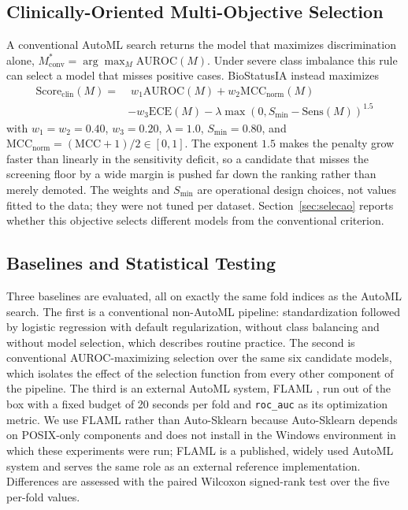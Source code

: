 \documentclass[conference]{IEEEtran}
\begin{document}
\subsection{Clinically-Oriented Multi-Objective Selection}
A conventional AutoML search returns the model that maximizes discrimination alone, $M^*_{\text{conv}} = \arg\max_{M} \text{AUROC}(M)$. Under severe class imbalance this rule can select a model that misses positive cases. BioStatusIA instead maximizes
\begin{align}
\text{Score}_{\text{clin}}(M) = & \; w_1 \text{AUROC}(M) + w_2 \text{MCC}_{\text{norm}}(M) \nonumber \\
& - w_3 \text{ECE}(M) - \lambda \max\!\left(0, S_{\min} - \text{Sens}(M)\right)^{1.5}
\end{align}
with $w_1 = w_2 = 0.40$, $w_3 = 0.20$, $\lambda = 1.0$, $S_{\min} = 0.80$, and $\text{MCC}_{\text{norm}} = (\text{MCC}+1)/2 \in [0,1]$. The exponent $1.5$ makes the penalty grow faster than linearly in the sensitivity deficit, so a candidate that misses the screening floor by a wide margin is pushed far down the ranking rather than merely demoted. The weights and $S_{\min}$ are operational design choices, not values fitted to the data; they were not tuned per dataset. Section~\ref{sec:selecao} reports whether this objective selects different models from the conventional criterion.

\subsection{Baselines and Statistical Testing}
Three baselines are evaluated, all on exactly the same fold indices as the AutoML search. The first is a conventional non-AutoML pipeline: standardization followed by logistic regression with default regularization, without class balancing and without model selection, which describes routine practice. The second is conventional AUROC-maximizing selection over the same six candidate models, which isolates the effect of the selection function from every other component of the pipeline. The third is an external AutoML system, FLAML \cite{flaml2021}, run out of the box with a fixed budget of 20 seconds per fold and \texttt{roc\_auc} as its optimization metric. We use FLAML rather than Auto-Sklearn because Auto-Sklearn depends on POSIX-only components and does not install in the Windows environment in which these experiments were run; FLAML is a published, widely used AutoML system and serves the same role as an external reference implementation. Differences are assessed with the paired Wilcoxon signed-rank test over the five per-fold values.
\end{document}
